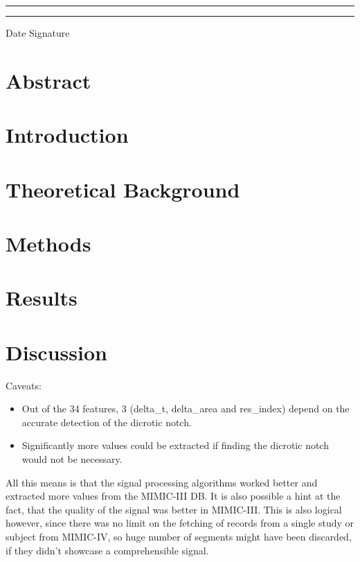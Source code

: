 \documentclass[12pt, bibliography=totoc]{scrartcl}
\begin{document}
    \rule{4cm}{0.5mm} \tab \qquad \qquad \rule{4cm}{0.5mm}

    Date \tab \qquad \qquad Signature

    \newpage
    \doublespacing
    \tableofcontents

    \newpage
    \onehalfspacing


    \section{Abstract}\label{sec:abstract}


    \section{Introduction}
    \label{sec:introduction}
    


    \section{Theoretical Background}
    \label{sec:background}
    


    \section{Methods}
    \label{sec:methods}
    


    \section{Results}
    \label{sec:results}
    


    \section{Discussion}
    \label{sec:discussion}

    Caveats:
    \begin{itemize}
        \item Out of the 34 features, 3 (delta\_t, delta\_area and res\_index) depend on the accurate detection of the dicrotic notch.
        \item Significantly more values could be extracted if finding the dicrotic notch would not be necessary.
    \end{itemize}

    All this means is that the signal processing algorithms worked better and extracted more values from the MIMIC-III DB.
    It is also possible a hint at the fact, that the quality of the signal was better in MIMIC-III.
    This is also logical however, since there was no limit on the fetching of records from a single study or subject from MIMIC-IV,
    so huge number of segments might have been discarded, if they didn't showcase a comprehensible signal.
\end{document}

